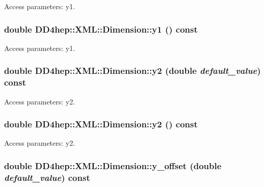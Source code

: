 Access parameters: y1. \hypertarget{struct_d_d4hep_1_1_x_m_l_1_1_dimension_ac48896940d49da56992a82d0c6fd23ba}{
\subsubsection[{y1}]{\setlength{\rightskip}{0pt plus 5cm}double DD4hep::XML::Dimension::y1 () const}}
\label{struct_d_d4hep_1_1_x_m_l_1_1_dimension_ac48896940d49da56992a82d0c6fd23ba}


Access parameters: y1. \hypertarget{struct_d_d4hep_1_1_x_m_l_1_1_dimension_ad9ab438e2b89a0ccf4560644a93f3cd6}{
\subsubsection[{y2}]{\setlength{\rightskip}{0pt plus 5cm}double DD4hep::XML::Dimension::y2 (double {\em default\_\-value}) const}}
\label{struct_d_d4hep_1_1_x_m_l_1_1_dimension_ad9ab438e2b89a0ccf4560644a93f3cd6}


Access parameters: y2. \hypertarget{struct_d_d4hep_1_1_x_m_l_1_1_dimension_acf89efeba201c33e2a2ef2dcb43705b9}{
\subsubsection[{y2}]{\setlength{\rightskip}{0pt plus 5cm}double DD4hep::XML::Dimension::y2 () const}}
\label{struct_d_d4hep_1_1_x_m_l_1_1_dimension_acf89efeba201c33e2a2ef2dcb43705b9}


Access parameters: y2. \hypertarget{struct_d_d4hep_1_1_x_m_l_1_1_dimension_a8a60f801518f3ba26ee1e81b623751f1}{
\subsubsection[{y\_\-offset}]{\setlength{\rightskip}{0pt plus 5cm}double DD4hep::XML::Dimension::y\_\-offset (double {\em default\_\-value}) const}}
\label{struct_d_d4hep_1_1_x_m_l_1_1_dimension_a8a60f801518f3ba26ee1e81b623751f1}



